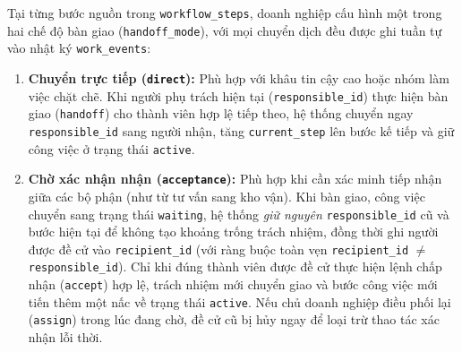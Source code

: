 Tại từng bước nguồn trong \texttt{workflow\_\hspace{0pt}steps}, doanh nghiệp cấu hình một trong hai chế độ bàn giao (\texttt{handoff\_\hspace{0pt}mode}), với mọi chuyển dịch đều được ghi tuần tự vào nhật ký
\texttt{work\_\hspace{0pt}events}:
\begin{enumerate}
  \item \textbf{Chuyển trực tiếp (\texttt{direct}):} Phù hợp với khâu tin cậy cao hoặc nhóm làm việc chặt chẽ. Khi người phụ trách hiện tại (\texttt{responsible\_\hspace{0pt}id}) thực hiện bàn giao
    (\texttt{handoff}) cho thành viên hợp lệ tiếp theo, hệ thống chuyển ngay \texttt{responsible\_\hspace{0pt}id} sang người nhận, tăng \texttt{current\_\hspace{0pt}step} lên bước kế tiếp và giữ công việc ở trạng thái
    \texttt{active}.
  \item \textbf{Chờ xác nhận nhận (\texttt{acceptance}):} Phù hợp khi cần xác minh tiếp nhận giữa các bộ phận (như từ tư vấn sang kho vận). Khi bàn giao, công việc chuyển sang trạng thái
    \texttt{waiting}, hệ thống \emph{giữ nguyên} \texttt{responsible\_\hspace{0pt}id} cũ và bước hiện tại để không tạo khoảng trống trách nhiệm, đồng thời ghi người được đề cử vào \texttt{recipient\_\hspace{0pt}id} (với
    ràng buộc toàn vẹn \texttt{recipient\_\hspace{0pt}id} $\neq$ \texttt{responsible\_\hspace{0pt}id}). Chỉ khi đúng thành viên được đề cử thực hiện lệnh chấp nhận (\texttt{accept}) hợp lệ, trách nhiệm mới chuyển giao
    và bước công việc mới tiến thêm một nấc về trạng thái \texttt{active}. Nếu chủ doanh nghiệp điều phối lại (\texttt{assign}) trong lúc đang chờ, đề cử cũ bị hủy ngay để loại trừ thao tác xác
    nhận lỗi thời.
\end{enumerate}

